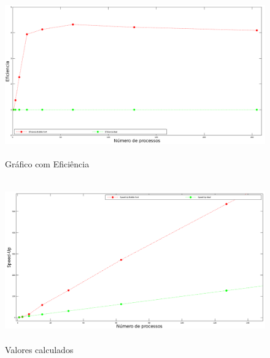 \documentclass{article}
\begin{document}
\begin{figure}[H]
            \centering
            \vspace{-0.3em}
            \includegraphics[width=14cm, height=7cm]{eficiencia.png}
            \vspace{-0.6em}
            \caption{Gráfico com Eficiência}
            \vspace{-1.1em}
\end{figure}

\begin{figure}[H]
            \centering
            \vspace{-0.3em}
            \includegraphics[width=14cm, height=7cm]{sup_close.png}
            \vspace{-0.6em}
            \caption{Valores calculados}
            \vspace{-1.1em}
\end{figure}
\newpage


\end{document}
